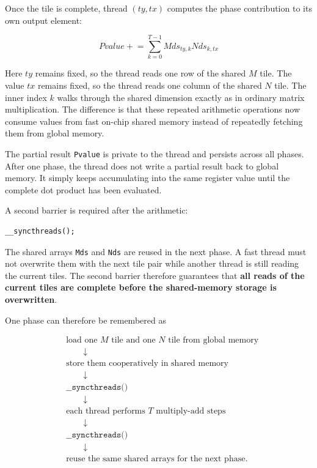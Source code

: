 \documentclass[11pt,a4paper]{article}
\begin{document}
Once the tile is complete, thread $(ty,tx)$ computes the phase contribution to its own output element:

\[
\boxed{
Pvalue
\mathrel{+}=
\sum_{k=0}^{T-1}
Mds_{ty,k}Nds_{k,tx}
}
\]

Here $ty$ remains fixed, so the thread reads one row of the shared $M$ tile. The value $tx$ remains fixed, so the thread reads one column of the shared $N$ tile. The inner index $k$ walks through the shared dimension exactly as in ordinary matrix multiplication. The difference is that these repeated arithmetic operations now consume values from fast on-chip shared memory instead of repeatedly fetching them from global memory.

The partial result \texttt{Pvalue} is private to the thread and persists across all phases. After one phase, the thread does not write a partial result back to global memory. It simply keeps accumulating into the same register value until the complete dot product has been evaluated.

A second barrier is required after the arithmetic:

\begin{lstlisting}
__syncthreads();
\end{lstlisting}

The shared arrays \texttt{Mds} and \texttt{Nds} are reused in the next phase. A fast thread must not overwrite them with the next tile pair while another thread is still reading the current tiles. The second barrier therefore guarantees that \textbf{all reads of the current tiles are complete before the shared-memory storage is overwritten}.

One phase can therefore be remembered as

\[
\begin{aligned}
&\text{load one }M\text{ tile and one }N\text{ tile from global memory} \\
&\qquad\downarrow \\
&\text{store them cooperatively in shared memory} \\
&\qquad\downarrow \\
&\texttt{\_\_syncthreads()} \\
&\qquad\downarrow \\
&\text{each thread performs }T\text{ multiply-add steps} \\
&\qquad\downarrow \\
&\texttt{\_\_syncthreads()} \\
&\qquad\downarrow \\
&\text{reuse the same shared arrays for the next phase}.
\end{aligned}
\]
\end{document}
